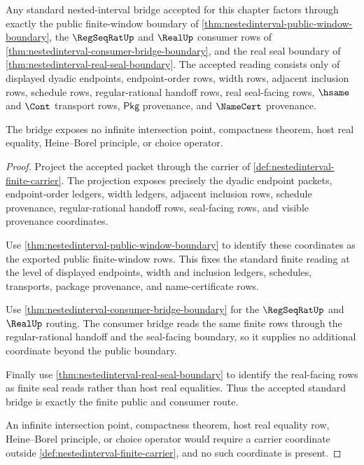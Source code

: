 \begin{theorem}
\label{thm:nestedinterval-standard-finite-row-bridge-acceptance}
Any standard nested-interval bridge accepted for this chapter factors through
exactly the public finite-window boundary of
\autoref{thm:nestedinterval-public-window-boundary}, the $\RegSeqRatUp$ and
$\RealUp$ consumer rows of
\autoref{thm:nestedinterval-consumer-bridge-boundary}, and the real seal
boundary of \autoref{thm:nestedinterval-real-seal-boundary}. The accepted
reading consists only of displayed dyadic endpoints, endpoint-order rows, width
rows, adjacent inclusion rows, schedule rows, regular-rational handoff rows,
real seal-facing rows, $\hsame$ and $\Cont$ transport rows, $\mathsf{Pkg}$
provenance, and $\NameCert$ provenance.

The bridge exposes no infinite intersection point, compactness theorem, host
real equality, Heine--Borel principle, or choice operator.
\end{theorem}
\begin{proof}
Project the accepted packet through the carrier of
\autoref{def:nestedinterval-finite-carrier}. The projection exposes precisely
the dyadic endpoint packets, endpoint-order ledgers, width ledgers, adjacent
inclusion rows, schedule provenance, regular-rational handoff rows,
seal-facing rows, and visible provenance coordinates.

Use \autoref{thm:nestedinterval-public-window-boundary} to identify these
coordinates as the exported public finite-window rows. This fixes the standard
finite reading at the level of displayed endpoints, width and inclusion
ledgers, schedules, transports, package provenance, and name-certificate rows.

Use \autoref{thm:nestedinterval-consumer-bridge-boundary} for the
$\RegSeqRatUp$ and $\RealUp$ routing. The consumer bridge reads the same
finite rows through the regular-rational handoff and the seal-facing boundary,
so it supplies no additional coordinate beyond the public boundary.

Finally use \autoref{thm:nestedinterval-real-seal-boundary} to identify the
real-facing rows as finite seal reads rather than host real equalities. Thus
the accepted standard bridge is exactly the finite public and consumer route.

An infinite intersection point, compactness theorem, host real equality row,
Heine--Borel principle, or choice operator would require a carrier coordinate
outside \autoref{def:nestedinterval-finite-carrier}, and no such coordinate is
present.
\end{proof}

